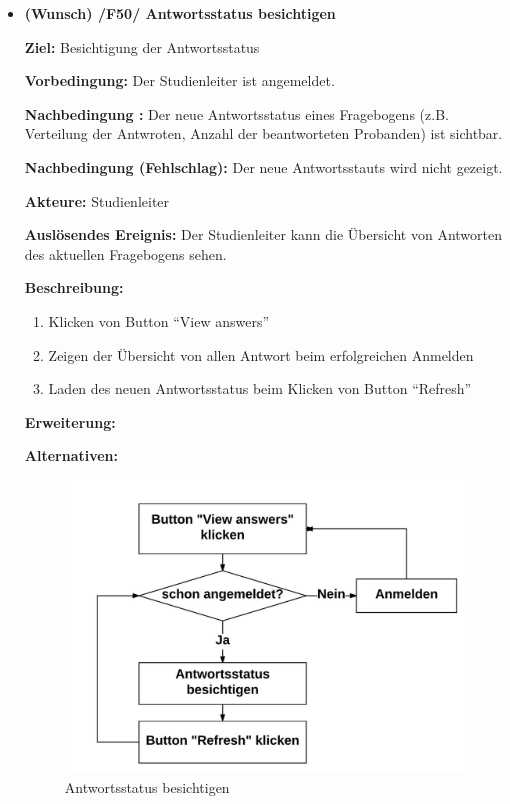 \documentclass[a4paper]{scrreprt}
\begin{document}
\begin{itemize}
                \item \textbf{(Wunsch) /F50/ \gls{Antwortsstatus} besichtigen}
                \par \textbf{Ziel: }Besichtigung der Antwortsstatus
                \par \textbf{Vorbedingung: }Der \gls{Studienleiter} ist angemeldet.
                \par \textbf{Nachbedingung : }Der neue Antwortsstatus eines Fragebogens (z.B. Verteilung der Antwroten, Anzahl der beantworteten \gls{Proband}en) ist sichtbar.
                \par \textbf{Nachbedingung (Fehlschlag): }Der neue Antwortsstauts wird nicht gezeigt.
                \par \textbf{Akteure: }\gls{Studienleiter}
                \par \textbf{Auslösendes Ereignis: }Der \gls{Studienleiter} kann die \"Ubersicht von Antworten des aktuellen Fragebogens sehen.
                \par \textbf{Beschreibung: }
                \begin{enumerate}
                    \item Klicken von Button ``View answers''
                    \item Zeigen der \"Ubersicht von allen Antwort beim erfolgreichen Anmelden
                    \item Laden des neuen Antwortsstatus beim Klicken von Button ``Refresh''
                \end{enumerate}
                \par \textbf{Erweiterung: }
                \par \textbf{Alternativen: }
                \begin{figure}[H]
                    \centering
                    \includegraphics[scale=0.9]{Antwortsstatus_besichtigen.jpeg}
                    \caption{Antwortsstatus besichtigen}
                \end{figure}
                \newpage


\end{itemize}
\end{document}
